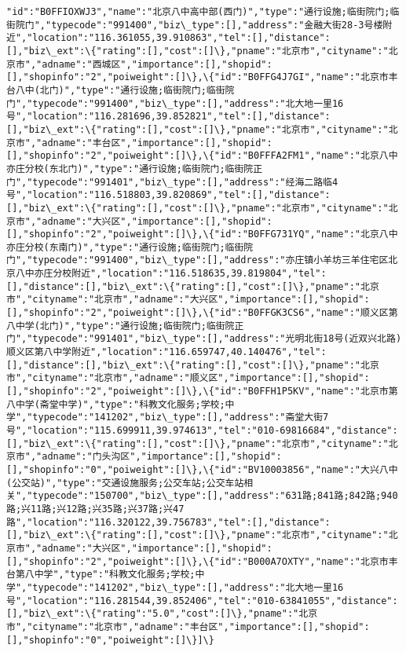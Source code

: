 \documentclass[11pt]{article}
\begin{document}
\begin{Verbatim}[commandchars=\\\{\}]
"id":"B0FFIOXWJ3","name":"北京八中高中部(西门)","type":"通行设施;临街院门;临街院门","typecode":"991400","biz\_type":[],"address":"金融大街28-3号楼附近","location":"116.361055,39.910863","tel":[],"distance":[],"biz\_ext":\{"rating":[],"cost":[]\},"pname":"北京市","cityname":"北京市","adname":"西城区","importance":[],"shopid":[],"shopinfo":"2","poiweight":[]\},\{"id":"B0FFG4J7GI","name":"北京市丰台八中(北门)","type":"通行设施;临街院门;临街院门","typecode":"991400","biz\_type":[],"address":"北大地一里16号","location":"116.281696,39.852821","tel":[],"distance":[],"biz\_ext":\{"rating":[],"cost":[]\},"pname":"北京市","cityname":"北京市","adname":"丰台区","importance":[],"shopid":[],"shopinfo":"2","poiweight":[]\},\{"id":"B0FFFA2FM1","name":"北京八中亦庄分校(东北门)","type":"通行设施;临街院门;临街院正门","typecode":"991401","biz\_type":[],"address":"经海二路临4号","location":"116.518803,39.820869","tel":[],"distance":[],"biz\_ext":\{"rating":[],"cost":[]\},"pname":"北京市","cityname":"北京市","adname":"大兴区","importance":[],"shopid":[],"shopinfo":"2","poiweight":[]\},\{"id":"B0FFG731YQ","name":"北京八中亦庄分校(东南门)","type":"通行设施;临街院门;临街院门","typecode":"991400","biz\_type":[],"address":"亦庄镇小羊坊三羊住宅区北京八中亦庄分校附近","location":"116.518635,39.819804","tel":[],"distance":[],"biz\_ext":\{"rating":[],"cost":[]\},"pname":"北京市","cityname":"北京市","adname":"大兴区","importance":[],"shopid":[],"shopinfo":"2","poiweight":[]\},\{"id":"B0FFGK3CS6","name":"顺义区第八中学(北门)","type":"通行设施;临街院门;临街院正门","typecode":"991401","biz\_type":[],"address":"光明北街18号(近双兴北路)顺义区第八中学附近","location":"116.659747,40.140476","tel":[],"distance":[],"biz\_ext":\{"rating":[],"cost":[]\},"pname":"北京市","cityname":"北京市","adname":"顺义区","importance":[],"shopid":[],"shopinfo":"2","poiweight":[]\},\{"id":"B0FFH1P5KV","name":"北京市第八中学(斋堂中学)","type":"科教文化服务;学校;中学","typecode":"141202","biz\_type":[],"address":"斋堂大街7号","location":"115.699911,39.974613","tel":"010-69816684","distance":[],"biz\_ext":\{"rating":[],"cost":[]\},"pname":"北京市","cityname":"北京市","adname":"门头沟区","importance":[],"shopid":[],"shopinfo":"0","poiweight":[]\},\{"id":"BV10003856","name":"大兴八中(公交站)","type":"交通设施服务;公交车站;公交车站相关","typecode":"150700","biz\_type":[],"address":"631路;841路;842路;940路;兴11路;兴12路;兴35路;兴37路;兴47路","location":"116.320122,39.756783","tel":[],"distance":[],"biz\_ext":\{"rating":[],"cost":[]\},"pname":"北京市","cityname":"北京市","adname":"大兴区","importance":[],"shopid":[],"shopinfo":"2","poiweight":[]\},\{"id":"B000A7OXTY","name":"北京市丰台第八中学","type":"科教文化服务;学校;中学","typecode":"141202","biz\_type":[],"address":"北大地一里16号","location":"116.281544,39.852406","tel":"010-63841055","distance":[],"biz\_ext":\{"rating":"5.0","cost":[]\},"pname":"北京市","cityname":"北京市","adname":"丰台区","importance":[],"shopid":[],"shopinfo":"0","poiweight":[]\}]\}

    \end{Verbatim}
\end{document}
